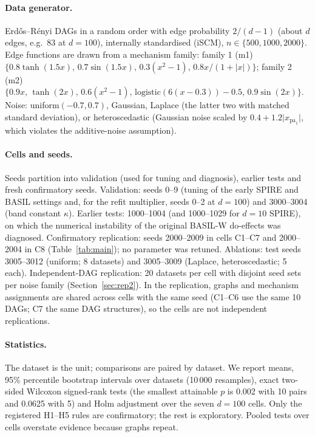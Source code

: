 \documentclass[11pt,a4paper]{article}
\begin{document}
\paragraph{Data generator.} Erdős--Rényi DAGs in a random order with edge probability $2/(d-1)$ (about $d$ edges, e.g.\ 83 at $d=100$), internally standardised (iSCM), $n\in\{500,1000,2000\}$. Edge functions are drawn from a mechanism family: family 1 (m1) $\{0.8\tanh(1.5x),\,0.7\sin(1.5x),\,0.3(x^2-1),\,0.8x/(1+|x|)\}$; family 2 (m2) $\{0.9x,\,\tanh(2x),\,0.6(x^2-1),\,\text{logistic}(6(x-0.3))-0.5,\,0.9\sin(2x)\}$. Noise: uniform$(-0.7,0.7)$, Gaussian, Laplace (the latter two with matched standard deviation), or heteroscedastic (Gaussian noise scaled by $0.4+1.2\lvert x_{\mathrm{pa}_1}\rvert$, which violates the additive-noise assumption).

\paragraph{Cells and seeds.} Seeds partition into validation (used for tuning and diagnosis), earlier tests and fresh confirmatory seeds. Validation: seeds 0--9 (tuning of the early SPIRE and BASIL settings and, for the refit multiplier, seeds 0--2 at $d=100$) and 3000--3004 (band constant $\kappa$). Earlier tests: 1000--1004 (and 1000--1029 for $d=10$ SPIRE), on which the numerical instability of the original BASIL-W do-effects was diagnosed. Confirmatory replication: seeds 2000--2009 in cells C1--C7 and 2000--2004 in C8 (Table~\ref{tab:main}); no parameter was retuned. Ablations: test seeds 3005--3012 (uniform; 8 datasets) and 3005--3009 (Laplace, heteroscedastic; 5 each). Independent-DAG replication: 20 datasets per cell with disjoint seed sets per noise family (Section~\ref{sec:rep2}). In the replication, graphs and mechanism assignments are shared across cells with the same seed (C1--C6 use the same 10 DAGs; C7 the same DAG structures), so the cells are not independent replications.

\paragraph{Statistics.} The dataset is the unit; comparisons are paired by dataset. We report means, 95\% percentile bootstrap intervals over datasets (10\,000 resamples), exact two-sided Wilcoxon signed-rank tests (the smallest attainable $p$ is 0.002 with 10 pairs and 0.0625 with 5) and Holm adjustment over the seven $d=100$ cells. Only the registered H1--H5 rules are confirmatory; the rest is exploratory. Pooled tests over cells overstate evidence because graphs repeat.
\end{document}
